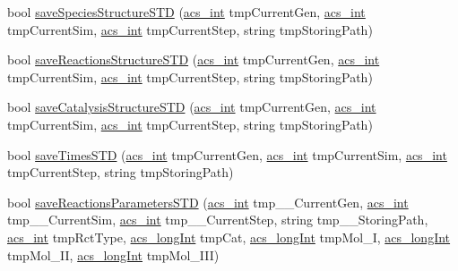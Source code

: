 \begin{DoxyCompactItemize}
\item 
bool \hyperlink{classenvironment_a9daeb4f255100b8ad59de9ea80b19b5b}{save\-Species\-Structure\-S\-T\-D} (\hyperlink{acs__headers_8h_a8d277355641a098190360234e2ebde35}{acs\-\_\-int} tmp\-Current\-Gen, \hyperlink{acs__headers_8h_a8d277355641a098190360234e2ebde35}{acs\-\_\-int} tmp\-Current\-Sim, \hyperlink{acs__headers_8h_a8d277355641a098190360234e2ebde35}{acs\-\_\-int} tmp\-Current\-Step, string tmp\-Storing\-Path)
\item 
bool \hyperlink{classenvironment_ad381c4ce24045d504539bb7c74800739}{save\-Reactions\-Structure\-S\-T\-D} (\hyperlink{acs__headers_8h_a8d277355641a098190360234e2ebde35}{acs\-\_\-int} tmp\-Current\-Gen, \hyperlink{acs__headers_8h_a8d277355641a098190360234e2ebde35}{acs\-\_\-int} tmp\-Current\-Sim, \hyperlink{acs__headers_8h_a8d277355641a098190360234e2ebde35}{acs\-\_\-int} tmp\-Current\-Step, string tmp\-Storing\-Path)
\item 
bool \hyperlink{classenvironment_a0a799b3a42bd90845a915298e184708c}{save\-Catalysis\-Structure\-S\-T\-D} (\hyperlink{acs__headers_8h_a8d277355641a098190360234e2ebde35}{acs\-\_\-int} tmp\-Current\-Gen, \hyperlink{acs__headers_8h_a8d277355641a098190360234e2ebde35}{acs\-\_\-int} tmp\-Current\-Sim, \hyperlink{acs__headers_8h_a8d277355641a098190360234e2ebde35}{acs\-\_\-int} tmp\-Current\-Step, string tmp\-Storing\-Path)
\item 
bool \hyperlink{classenvironment_a73e83c4fcfe612514714a6692270351e}{save\-Times\-S\-T\-D} (\hyperlink{acs__headers_8h_a8d277355641a098190360234e2ebde35}{acs\-\_\-int} tmp\-Current\-Gen, \hyperlink{acs__headers_8h_a8d277355641a098190360234e2ebde35}{acs\-\_\-int} tmp\-Current\-Sim, \hyperlink{acs__headers_8h_a8d277355641a098190360234e2ebde35}{acs\-\_\-int} tmp\-Current\-Step, string tmp\-Storing\-Path)
\item 
bool \hyperlink{classenvironment_ad78fcf39a80e447a9aa2f84ab74335e5}{save\-Reactions\-Parameters\-S\-T\-D} (\hyperlink{acs__headers_8h_a8d277355641a098190360234e2ebde35}{acs\-\_\-int} tmp\-\_\-\-\_\-\-Current\-Gen, \hyperlink{acs__headers_8h_a8d277355641a098190360234e2ebde35}{acs\-\_\-int} tmp\-\_\-\-\_\-\-Current\-Sim, \hyperlink{acs__headers_8h_a8d277355641a098190360234e2ebde35}{acs\-\_\-int} tmp\-\_\-\-\_\-\-Current\-Step, string tmp\-\_\-\-\_\-\-Storing\-Path, \hyperlink{acs__headers_8h_a8d277355641a098190360234e2ebde35}{acs\-\_\-int} tmp\-Rct\-Type, \hyperlink{acs__headers_8h_a19319d75f02db4308bc5c0026d98cd85}{acs\-\_\-long\-Int} tmp\-Cat, \hyperlink{acs__headers_8h_a19319d75f02db4308bc5c0026d98cd85}{acs\-\_\-long\-Int} tmp\-Mol\-\_\-\-I, \hyperlink{acs__headers_8h_a19319d75f02db4308bc5c0026d98cd85}{acs\-\_\-long\-Int} tmp\-Mol\-\_\-\-I\-I, \hyperlink{acs__headers_8h_a19319d75f02db4308bc5c0026d98cd85}{acs\-\_\-long\-Int} tmp\-Mol\-\_\-\-I\-I\-I)

\end{DoxyCompactItemize}
